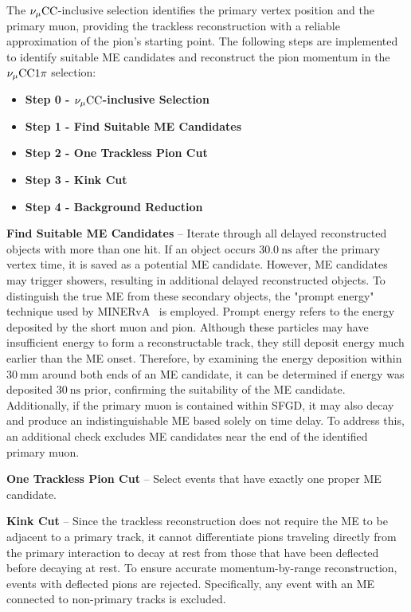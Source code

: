           The $\nu_{\mu}\textrm{CC}$-inclusive selection identifies the primary vertex position and the primary muon, providing the trackless reconstruction with a reliable approximation of the pion's starting point. 
          The following steps are implemented to identify suitable ME candidates and reconstruct the pion momentum in the $\nu_{\mu}\textrm{CC}1\pi$ selection:
          \begin{itemize}
          \item \textbf{Step 0 - $\nu_{\mu}\textrm{CC}$-inclusive Selection}
          \item \textbf{Step 1 - Find Suitable ME Candidates}
          \item \textbf{Step 2 - One Trackless Pion Cut}
          \item \textbf{Step 3 - Kink Cut}
          \item \textbf{Step 4 - Background Reduction}
          \end{itemize}
          \textbf{Find Suitable ME Candidates} – Iterate through all delayed reconstructed objects with more than one hit. 
          If an object occurs $30.0~\textrm{ns}$ after the primary vertex time, it is saved as a potential ME candidate. 
          However, ME candidates may trigger showers, resulting in additional delayed reconstructed objects. 
          To distinguish the true ME from these secondary objects, the "prompt energy" technique used by MINERvA~\cite{Zhang:2016glf} is employed. 
          Prompt energy refers to the energy deposited by the short muon and pion. 
          Although these particles may have insufficient energy to form a reconstructable track, they still deposit energy much earlier than the ME onset. 
          Therefore, by examining the energy deposition within $30~\textrm{mm}$ around both ends of an ME candidate, it can be determined if energy was deposited $30~\textrm{ns}$ prior, confirming the suitability of the ME candidate. 
          Additionally, if the primary muon is contained within SFGD, it may also decay and produce an indistinguishable ME based solely on time delay. 
          To address this, an additional check excludes ME candidates near the end of the identified primary muon.

          \textbf{One Trackless Pion Cut} – Select events that have exactly one proper ME candidate.

          \textbf{Kink Cut} – Since the trackless reconstruction does not require the ME to be adjacent to a primary track, it cannot differentiate pions traveling directly from the primary interaction to decay at rest from those that have been deflected before decaying at rest. 
          To ensure accurate momentum-by-range reconstruction, events with deflected pions are rejected. 
          Specifically, any event with an ME connected to non-primary tracks is excluded.

